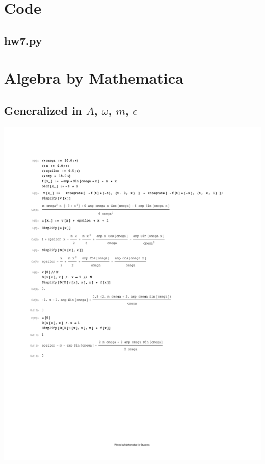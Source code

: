 \documentclass[10pt]{article}
\newcommand{\code}[2]{
    \subsection*{#1}
    
    \vspace{2em}
}
\begin{document}
\clearpage

\section{Code}
\label{sec:code}

\code{hw7.py}{hw7.py}

\section{Algebra by Mathematica}
\label{sec:mathematica}

% 
\subsection{Generalized in $A$, $\omega$, $m$, $\epsilon$}
\includegraphics[width=\columnwidth,keepaspectratio=true]{hw7-mathematica-general.pdf}

\pagebreak
\end{document}
